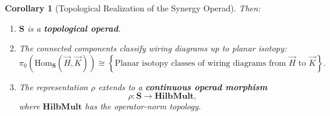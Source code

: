 \documentclass[11pt]{article}
\newtheorem{corollary}{Corollary}
\begin{document}
\begin{corollary}[Topological Realization of the Synergy Operad]
Then:
\begin{enumerate}
    \item $\mathbf{S}$ is a \textbf{topological operad}.
    \item The connected components classify wiring diagrams up to planar isotopy:
    \[
        \pi_0\left(\mathrm{Hom}_{\mathbf{S}}(\vec{H}, \vec{K})\right)
        \cong \left\{ \text{Planar isotopy classes of wiring diagrams from $\vec{H}$ to $\vec{K}$} \right\}.
    \]
    \item The representation $\rho$ extends to a \textbf{continuous operad morphism}
    \[
        \rho : \mathbf{S} \longrightarrow \mathbf{HilbMult},
    \]
    where $\mathbf{HilbMult}$ has the operator-norm topology.
\end{enumerate}
\end{corollary}
\end{document}
